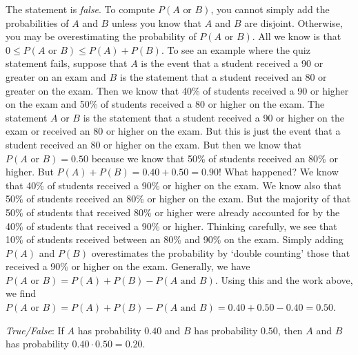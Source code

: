 \documentclass[11pt,letterpaper]{article}
\begin{document}
\sol The statement is \textit{false}. To compute $P(A \text{ or }B)$, you cannot simply add the probabilities of $A$ and $B$ unless you know that $A$ and $B$ are disjoint. Otherwise, you may be overestimating the probability of $P(A \text{ or }B)$. All we know is that $0 \leq P(A \text{ or }B) \leq P(A) + P(B)$. To see an example where the quiz statement fails, suppose that $A$ is the event that a student received a 90 or greater on an exam and $B$ is the statement that a student received an 80 or greater on the exam. Then we know that 40\% of students received a 90 or higher on the exam and 50\% of students received a 80 or higher on the exam. The statement $A \text{ or } B$ is the statement that a student received a 90 or higher on the exam or received an 80 or higher on the exam. But this is just the event that a student received an 80 or higher on the exam. But then we know that $P(A \text{ or } B)= 0.50$ because we know that 50\% of students received an 80\% or higher. But $P(A) + P(B)= 0.40 + 0.50= 0.90$! What happened? We know that 40\% of students received a 90\% or higher on the exam. We know also that 50\% of students received an 80\% or higher on the exam. But the majority of that 50\% of students that received 80\% or higher were already accounted for by the 40\% of students that received a 90\% or higher. Thinking carefully, we see that 10\% of students received between an 80\% and 90\% on the exam. Simply adding $P(A)$ and $P(B)$ overestimates the probability by `double counting' those that received a 90\% or higher on the exam. Generally, we have $P(A \text{ or }B)= P(A) + P(B) - P(A \text{ and } B)$. Using this and the work above, we find $P(A \text{ or } B)= P(A) + P(B) - P(A \text{ and } B)= 0.40 + 0.50 - 0.40= 0.50$. \pvspace{1.3cm}



\newpage



\quizsol \textit{True/False}: If $A$ has probability $0.40$ and $B$ has probability $0.50$, then $A$ and $B$ has probability $0.40 \cdot 0.50= 0.20$. \pspace
\end{document}
